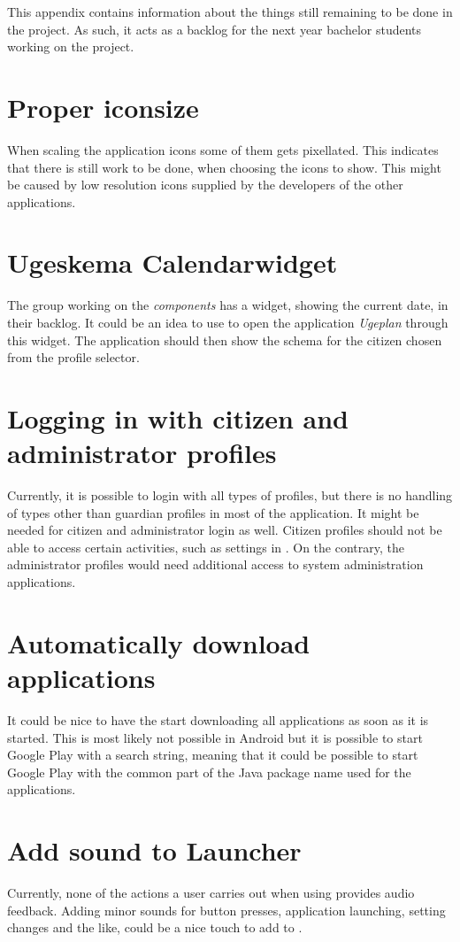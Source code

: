 This appendix contains information about the things still remaining to be done in the \launcher project.
As such, it acts as a backlog for the next year bachelor students working on the project.

\section{Proper iconsize}
When scaling the application icons some of them gets pixellated.
This indicates that there is still work to be done, when choosing the icons to show.
This might be caused by low resolution icons supplied by the developers of the other applications.

\section{Ugeskema Calendarwidget}
The group working on the \textit{\giraf components} has a widget, showing the current date, in their backlog.
It could be an idea to use to open the application \textit{Ugeplan} through this widget. The application should then show the schema for the citizen chosen from the profile selector.

\section{Logging in with citizen and administrator profiles}
Currently, it is possible to login with all types of profiles, but there is no handling of types other than guardian profiles in most of the application.
It might be needed for citizen and administrator login as well.
Citizen profiles should not be able to access certain activities, such as settings in \launcher.
On the contrary, the administrator profiles would need additional access to system administration applications.

\section{Automatically download \giraf applications}
It could be nice to have the \launcher start downloading all \giraf applications as soon as it is started.
This is most likely not possible in Android but it is possible to start Google Play with a search string, meaning that it could be possible to start Google Play with the common part of the Java package name used for the \giraf applications.

\section{Add sound to Launcher}
Currently, none of the actions a user carries out when using \launcher provides audio feedback.
Adding minor sounds for button presses, application launching, setting changes and the like, could be a nice touch to add to \launcher. 

